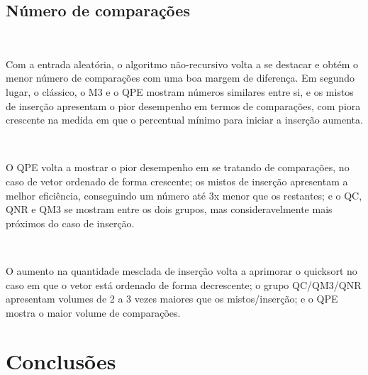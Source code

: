 \documentclass[11pt]{article}
\begin{document}
    \subsection{Número de comparações}\label{nuxfamero-de-comparauxe7uxf5es}

    \begin{center}
    \end{center}
    { \hspace*{\fill} \\}
    
    Com a entrada aleatória, o algoritmo não-recursivo volta a se destacar e
obtém o menor número de comparações com uma boa margem de diferença. Em
segundo lugar, o clássico, o M3 e o QPE mostram números similares entre
si, e os mistos de inserção apresentam o pior desempenho em termos de
comparações, com piora crescente na medida em que o percentual mínimo
para iniciar a inserção aumenta.

    \begin{center}
    \end{center}
    { \hspace*{\fill} \\}
    
    O QPE volta a mostrar o pior desempenho em se tratando de comparações,
no caso de vetor ordenado de forma crescente; os mistos de inserção
apresentam a melhor eficiência, conseguindo um número até 3x menor que
os restantes; e o QC, QNR e QM3 se mostram entre os dois grupos, mas
consideravelmente mais próximos do caso de inserção.

    \begin{center}
    \end{center}
    { \hspace*{\fill} \\}
    
    O aumento na quantidade mesclada de inserção volta a aprimorar o
quicksort no caso em que o vetor está ordenado de forma decrescente; o
grupo QC/QM3/QNR apresentam volumes de 2 a 3 vezes maiores que os
mistos/inserção; e o QPE mostra o maior volume de comparações.

    \section{Conclusões}\label{conclusuxf5es}
\end{document}
